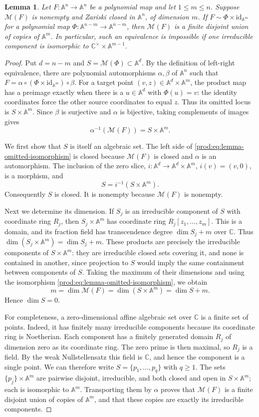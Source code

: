 \documentclass[11pt]{article}
\numberwithin{equation}{section}
\theoremstyle{plain}
\newtheorem{lemma}[theorem]{Lemma}
\theoremstyle{definition}
\theoremstyle{remark}
\newcommand{\C}{\mathbb{C}}
\newcommand{\A}{\mathbb{A}}
\newcommand{\id}{\mathrm{id}}
\newcommand{\Miss}{\mathcal M}
\begin{document}
\begin{lemma}\label{prod:lem:obstruction}
Let $F:\A^n\to\A^n$ be a polynomial map and let $1\leq m\leq n$.
Suppose $\Miss(F)$ is nonempty and Zariski closed in $\A^n$, of dimension $m$.
If $F\sim\Phi\times\id_{\A^m}$ for a polynomial map
$\Phi:\A^{n-m}\to\A^{n-m}$, then $\Miss(F)$ is a finite disjoint
union of copies of $\A^m$. In particular, such an equivalence is impossible
if one irreducible component is isomorphic to
$\C^\times\times\A^{m-1}$.
\end{lemma}
\begin{proof}
Put $d=n-m$ and $S=\Miss(\Phi)\subset\A^d$. By the definition of
left-right equivalence, there are polynomial automorphisms $\alpha,\beta$
of $\A^n$ such that
$F=\alpha\circ(\Phi\times\id_{\A^m})\circ\beta$.
For a target point $(v,z)\in\A^d\times\A^m$, the product map has a
preimage exactly when there is a $u\in\A^d$ with $\Phi(u)=v$:
the identity coordinates force the other source coordinates to equal $z$.
Thus its omitted locus is $S\times\A^m$. Since $\beta$ is surjective
and $\alpha$ is bijective, taking complements of images gives
\begin{equation}\label{prod:eq:lemma-omitted-isomorphism}
 \alpha^{-1}(\Miss(F))=S\times\A^m.
\end{equation}

We first show that $S$ is itself an algebraic set. The left side of
\eqref{prod:eq:lemma-omitted-isomorphism} is closed because $\Miss(F)$ is
closed and $\alpha$ is an automorphism. The inclusion of the zero slice,
$i:\A^d\to\A^d\times\A^m$, $i(v)=(v,0)$, is a morphism, and
\[
 S=i^{-1}(S\times\A^m).
\]
Consequently $S$ is closed. It is nonempty because $\Miss(F)$ is nonempty.

Next we determine its dimension. If $S_j$ is an irreducible component
of $S$ with coordinate ring $R_j$, then
$S_j\times\A^m$ has coordinate ring $R_j[z_1,\ldots,z_m]$.
This is a domain, and its fraction field has transcendence degree
$\dim S_j+m$ over $\C$. Thus
$\dim(S_j\times\A^m)=\dim S_j+m$.
These products are precisely the irreducible components of
$S\times\A^m$: they are irreducible closed sets covering it, and none
is contained in another, since projection to $S$ would imply the same
containment between components of $S$.
Taking the maximum of their dimensions and using the isomorphism
\eqref{prod:eq:lemma-omitted-isomorphism}, we obtain
\[
 m=\dim\Miss(F)=\dim(S\times\A^m)=\dim S+m.
\]
Hence $\dim S=0$.

For completeness, a zero-dimensional affine algebraic set over $\C$
is a finite set of points. Indeed, it has finitely many irreducible
components because its coordinate ring is Noetherian. Each component
has a finitely generated domain $R_j$ of dimension zero as its coordinate
ring. The zero prime is then maximal, so $R_j$ is a field. By the weak
Nullstellensatz this field is $\C$, and hence the component is a single
point. We can therefore write $S=\{p_1,\ldots,p_q\}$ with $q\geq1$.
The sets $\{p_j\}\times\A^m$ are pairwise disjoint, irreducible, and
both closed and open in $S\times\A^m$; each is isomorphic to $\A^m$.
Transporting them by $\alpha$ proves that $\Miss(F)$ is a finite
disjoint union of copies of $\A^m$, and that these copies are exactly
its irreducible components.


\end{proof}
\end{document}
